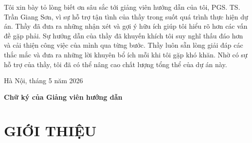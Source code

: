\documentclass[a4paper,12pt]{report}
\begin{document}
\vspace{1cm}

{
\linespread{1.3}\selectfont
\setlength{\parskip}{1em}
\setlength{\parindent}{1.5em}

Tôi xin bày tỏ lòng biết ơn sâu sắc tới giảng viên hướng dẫn của tôi, PGS. TS. Trần Giang Sơn, vì sự hỗ trợ tận tình của thầy trong suốt quá trình thực hiện dự án. Thầy đã đưa ra những nhận xét và gợi ý hữu ích giúp tôi hiểu rõ hơn các vấn đề gặp phải. Sự hướng dẫn của thầy đã khuyến khích tôi suy nghĩ thấu đáo hơn và cải thiện công việc của mình qua từng bước. Thầy luôn sẵn lòng giải đáp các thắc mắc và đưa ra những lời khuyên bổ ích mỗi khi tôi gặp khó khăn. Nhờ có sự hỗ trợ của thầy, tôi đã có thể nâng cao chất lượng tổng thể của dự án này.

\noindent Hà Nội, tháng 5 năm 2026
}

\vspace{3cm}

\noindent \textbf{Chữ ký của Giảng viên hướng dẫn}


\newpage

{
\linespread{1.3}\selectfont
\setlength{\parskip}{0.5em}

\tableofcontents
{}
\newpage

\listoffigures
{}
\newpage

\listoftables
{}
}
\newpage

\chapter{GIỚI THIỆU}

\setlength{\parindent}{0pt} %
\setlength{\parskip}{1.2em} %
\linespread{1.3}\selectfont %
\titlespacing*{\section}{0pt}{12pt}{4pt} %
\end{document}
